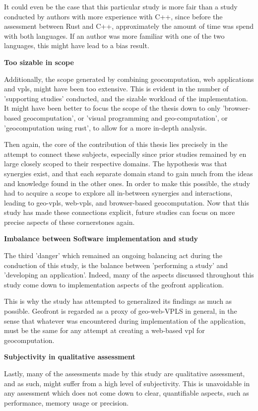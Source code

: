 It could even be the case that this particular study is more fair than a study conducted by authors with more experience with C++, since before the assessment between Rust and C++, approximately the amount of time was spend with both languages. 
If an author was more familiar with one of the two languages, this might have lead to a bias result. 

\textbf{Too sizable in scope}

Additionally, the scope generated by combining geocomputation, web applications and vpls, might have been too extensive. 
This is evident in the number of 'supporting studies' conducted, and the sizable workload of the implementation.
It might have been better to focus the scope of the thesis down to only 'browser-based geocomputation', or 'visual programming and geo-computation', or 'geocomputation using rust', to allow for a more in-depth analysis.

Then again, the core of the contribution of this thesis lies precisely in the attempt to connect these subjects,
especially since prior studies remained by en large closely scoped to their respective domains.
The hypothesis was that synergies exist, and that each separate domain stand to gain much from the ideas and knowledge found in the other ones. 
In order to make this possible, the study had to acquire a scope to explore all in-between synergies and interactions, leading to geo-vpls, web-vpls, and browser-based geocomputation. 
Now that this study has made these connections explicit, future studies can focus on more precise aspects of these cornerstones again.

\textbf{Imbalance between Software implementation and study}

The third 'danger' which remained an ongoing balancing act during the conduction of this study, is the balance between 'performing a study' and 'developing an application'. 
Indeed, many of the aspects discussed throughout this study come down to implementation aspects of the geofront application. 

This is why the study has attempted to generalized its findings as much as possible.
Geofront is regarded as a proxy of geo-web-VPLS in general, in the sense that whatever was encountered during implementation of the application, must be the same for any attempt at creating a web-based vpl for geocomputation.

\textbf{Subjectivity in qualitative assessment}

Lastly, many of the assessments made by this study are qualitative assessment, and as such, might suffer from a high level of subjectivity. 
This is unavoidable in any assessment which does not come down to clear, quantifiable aspects, such as performance, memory usage or precision. 

